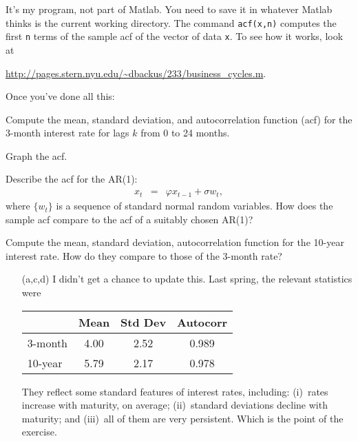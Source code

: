 \documentclass[11pt]{exam}
\begin{document}
\begin{questions}
It's my program, not part of Matlab.
You need to save it in whatever Matlab thinks is the current working directory.
The command {\tt acf(x,n)} computes the first {\tt n} terms of
the sample acf of the vector of data {\tt x}.
To see how it works, look at

\url{http://pages.stern.nyu.edu/~dbackus/233/business_cycles.m}.

Once you've done all this:
%
\begin{parts}
\item Compute the mean, standard deviation,
and autocorrelation function (acf) for the 3-month
interest rate for lags $k$ from 0 to 24 months.

\item Graph the acf.

\item Describe the acf for the AR(1):
\begin{eqnarray*}
    x_t &=&  \varphi x_{t-1} + \sigma w_t ,
\end{eqnarray*}
where $ \{ w_t \}$ is a sequence of standard normal random variables.
How does the sample acf compare to the acf of a suitably chosen AR(1)?

\item Compute the mean, standard deviation,
autocorrelation function for the 10-year interest rate.
How do they compare to those of the 3-month rate?
\end{parts}

\begin{solution}
\begin{enumerate}
\item [(a,c,d)]
I didn't get a chance to update this.  Last spring, the relevant statistics were

\begin{center}
\begin{tabular}{lccc}
\toprule
        &  Mean & Std Dev & Autocorr \\
\midrule
3-month  &   4.00 & 2.52 & 0.989  \\
10-year  &   5.79 & 2.17 & 0.978  \\
\bottomrule
\end{tabular}
\end{center}

They reflect some standard features of interest rates, including:
(i)~rates increase with maturity, on average;
(ii)~standard deviations decline with maturity;
and (iii)~all of them are very persistent.
Which is the point of the exercise.


\end{enumerate}
\end{solution}
\end{questions}
\end{document}
